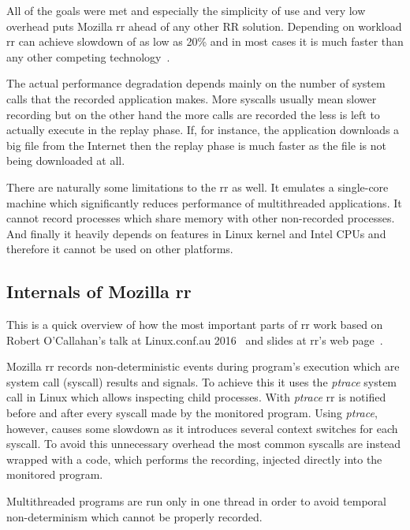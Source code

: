 \documentclass[thesis=M,english,hidelinks]{FITthesis}[2012/10/20]
\begin{document}
	All of the goals were met and especially the simplicity of use and very low overhead puts Mozilla rr ahead of any other RR solution. Depending on workload rr can achieve slowdown of as low as 20\% and in most cases it is much faster than any other competing technology~\cite{rr}.\par
	
	The actual performance degradation depends mainly on the number of system calls that the recorded application makes. More syscalls usually mean slower recording but on the other hand the more calls are recorded the less is left to actually execute in the replay phase. If, for instance, the application downloads a big file from the Internet then the replay phase is much faster as the file is not being downloaded at all.\par
	
	There are naturally some limitations to the rr as well. It emulates a single-core machine which significantly reduces performance of multithreaded applications. It cannot record processes which share memory with other non-recorded processes. And finally it heavily depends on features in Linux kernel and Intel CPUs and therefore it cannot be used on other platforms.\par
		
		\subsection{Internals of Mozilla rr}
		This is a quick overview of how the most important parts of rr work based on Robert O'Callahan's talk at Linux.conf.au 2016~\cite{rr_vid} and slides at rr's web page~\cite{rr_slides}.
		
		Mozilla rr records non-deterministic events during program's execution which are system call (syscall) results and signals. To achieve this it uses the \emph{ptrace} system call in Linux which allows inspecting child processes. With \emph{ptrace} rr is notified before and after every syscall made by the monitored program. Using \emph{ptrace}, however, causes some slowdown as it introduces several context switches for each syscall. To avoid this unnecessary overhead the most common syscalls are instead wrapped with a code, which performs the recording, injected directly into the monitored program.\par
		
		Multithreaded programs are run only in one thread in order to avoid temporal non-determinism which cannot be properly recorded.\par
		
\end{document}
